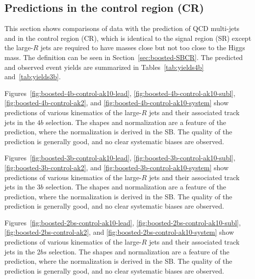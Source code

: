\clearpage


\subsection{Predictions in the control region (CR)}
\label{sec:boosted-cr}

This section shows comparisons of data with the prediction of QCD multi-jets and \ttbar in the control region (CR), which is identical to the signal region (SR) except the large-$R$ jets are required to have masses close but not too close to the Higgs mass. The definition can be seen in Section~\ref{sec:boosted-SBCR}. The predicted and observed event yields are summarized in Tables~\ref{tab:yields4b} and~\ref{tab:yields3b}.

Figures~\ref{fig:boosted-4b-control-ak10-lead}, \ref{fig:boosted-4b-control-ak10-subl}, \ref{fig:boosted-4b-control-ak2}, and \ref{fig:boosted-4b-control-ak10-system} show predictions of various kinematics of the large-$R$ jets and their associated track jets in the $4b$ selection. The shapes and normalization are a feature of the prediction, where the normalization is derived in the SB. The quality of the prediction is generally good, and no clear systematic biases are observed.

Figures~\ref{fig:boosted-3b-control-ak10-lead}, \ref{fig:boosted-3b-control-ak10-subl}, \ref{fig:boosted-3b-control-ak2},  and \ref{fig:boosted-3b-control-ak10-system} show predictions of various kinematics of the large-$R$ jets and their associated track jets in the $3b$ selection. The shapes and normalization are a feature of the prediction, where the normalization is derived in the SB. The quality of the prediction is generally good, and no clear systematic biases are observed.

Figures~\ref{fig:boosted-2bs-control-ak10-lead}, \ref{fig:boosted-2bs-control-ak10-subl}, \ref{fig:boosted-2bs-control-ak2},  and \ref{fig:boosted-2bs-control-ak10-system} show predictions of various kinematics of the large-$R$ jets and their associated track jets in the 2$bs$ selection. The shapes and normalization are a feature of the prediction, where the normalization is derived in the SB. The quality of the prediction is generally good, and no clear systematic biases are observed.

